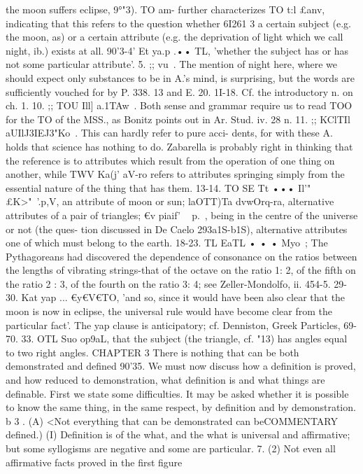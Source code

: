 {{{{{{{{{{{{{{{{{{{{{the moon suffers eclipse, 9°"3). TO am\ws- further characterizes
TO t:l £anv, indicating that this refers to the question whether
6I261 3
a certain subject (e.g. the moon, as) or a certain attribute (e.g. the
deprivation of light which we call night, ib.) exists at all.
90'3-4' Et ya.p .•• TL, 'whether the subject has or has not some
particular attribute'.
5. ;; vu~. The mention of night here, where we should expect
only substances to be in A.'s mind, is surprising, but the words
are sufficiently vouched for by P. 338. 13 and E. 20. 1I-18. Cf.
the introductory n. on ch. 1.
10. ;; TOU Ill] a.1TAw~. Both sense and grammar require us to
read TOO for the TO of the MSS., as Bonitz points out in Ar.
Stud. iv. 28 n.
11. ;; KClTIl aUIlJ3IEJ3"Ko~. This can hardly refer to pure acci-
dents, for with these A. holds that science has nothing to do.
Zabarella is probably right in thinking that the reference is to
attributes which result from the operation of one thing on another,
while TWV Ka(j' aV-ro refers to attributes springing simply from the
essential nature of the thing that has them.
13-14. TO SE Tt ••• Il'" £K>"~'.p,V, an attribute of moon or sun;
laOTT)Ta dvwOrq-ra, alternative attributes of a pair of triangles;
€v piaif' ~ p.~, being in the centre of the universe or not (the ques-
tion discussed in De Caelo 293a1S-b1S), alternative attributes one
of which must belong to the earth.
18-23. TL EaTL • • • Myo~; The Pythagoreans had discovered
the dependence of consonance on the ratios between the lengths of
vibrating strings-that of the octave on the ratio 1: 2, of the fifth
on the ratio 2 : 3, of the fourth on the ratio 3: 4; see Zeller-Mondolfo,
ii. 454-5.
29-30. Kat yap ... €y€V€TO, 'and so, since it would have been
also clear that the moon is now in eclipse, the universal rule would
have become clear from the particular fact'. The yap clause is
anticipatory; cf. Denniston, Greek Particles, 69-70.
33. OTL Suo op9aL, that the subject (the triangle, cf. "13) has
angles equal to two right angles.
CHAPTER 3
There is nothing that can be both demonstrated and defined
90'35. We must now discuss how a definition is proved, and
how reduced to demonstration, what definition is and what things
are definable. First we state some difficulties. It may be asked
whether it is possible to know the same thing, in the same respect,
by definition and by demonstration.
b 3 . (A) <Not everything that can be demonstrated can beCOMMENTARY
defined.) (I) Definition is of the what, and the what is universal
and affirmative; but some syllogisms are negative and some are
particular.
7. (2) Not even all affirmative facts proved in the first figure
}}}}}}}}}}}}}}}}}}}}}

